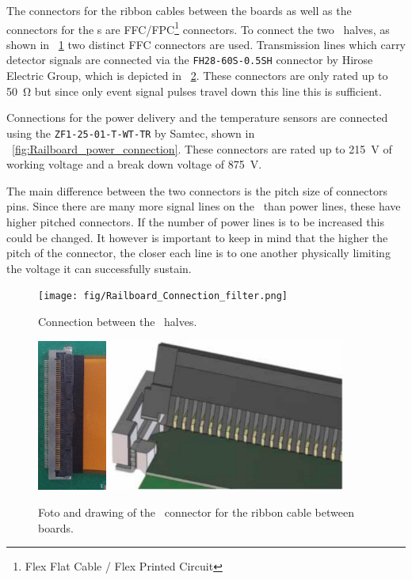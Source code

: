 \documentclass[../BTOF_summary.tex]{subfiles}
\begin{document}
The connectors for the ribbon cables between the boards as well as the connectors for the \sensorboard s are FFC/FPC\footnote{Flex Flat Cable / Flex Printed Circuit} connectors.
To connect the two \railboard\ halves, as shown in \fig ~\ref{fig:Railboard_connection} two distinct FFC connectors are used.
Transmission lines which carry detector signals are connected via the \texttt{FH28-60S-0.5SH} connector by Hirose Electric Group, which is depicted in \fig~\ref{fig:Railboard_connector}.
These connectors are only rated up to \SI{50}{\ohm} but since only event signal pulses travel down this line this is sufficient.

Connections for the power delivery and the temperature sensors are connected using the \texttt{ZF1-25-01-T-WT-TR} by Samtec, shown in \fig~\ref{fig:Railboard_power_connection}.
These connectors are rated up to \SI{215}{V} of working voltage and a break down voltage of \SI{875}{V}.

The main difference between the two connectors is the pitch size of connectors pins.
Since there are many more signal lines on the \railboard\ than power lines, these have higher pitched connectors.
If the number of power lines is to be increased this could be changed.
It however is important to keep in mind that the higher the pitch of the connector, the closer each line is to one another physically limiting the voltage it can successfully sustain.

\begin{figure}[htbp]
	\centering
	\texttt{[image: fig/Railboard\_Connection\_filter.png]}
	\caption{Connection between the \railboard\ halves.}
	\label{fig:Railboard_connection}
\end{figure}

\begin{figure}[htbp]
	\centering
	\includegraphics[height=5cm]{fig/LargeConnector_cable_crop.jpg}
	\includegraphics[height=5cm]{fig/hirose_connector_drawing.png}
	\caption{Foto and drawing of the \railboard\ connector for the ribbon cable between boards.}
	\label{fig:Railboard_connector}
\end{figure}
\end{document}
